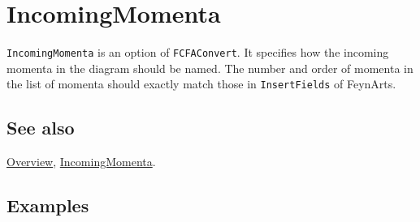 \documentclass[../FeynCalcManual.tex]{subfiles}
\begin{document}
\hypertarget{incomingmomenta}{%
\section{IncomingMomenta}\label{incomingmomenta}}

\texttt{IncomingMomenta} is an option of \texttt{FCFAConvert}. It
specifies how the incoming momenta in the diagram should be named. The
number and order of momenta in the list of momenta should exactly match
those in \texttt{InsertFields} of FeynArts.

\subsection{See also}

\hyperlink{toc}{Overview}, \hyperlink{incomingmomenta}{IncomingMomenta}.

\subsection{Examples}
\end{document}
